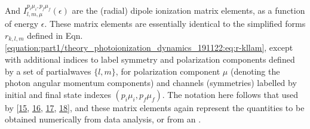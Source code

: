\documentclass[letterpaper,table,10pt,english]{jupyterBook}
\begin{document}
\sphinxAtStartPar
And \(I_{l,m,\mu}^{p_{i}\mu_{i},p_{f}\mu_{f}}(\epsilon)\) are the (radial)
dipole ionization matrix elements, as a function of energy \(\epsilon\).
These matrix elements are essentially identical to the simplified forms
\(r_{k,l,m}\) defined in Eqn. \eqref{equation:part1/theory_photoionization_dynamics_191122:eq:r-kllam}, except with additional indices to label
symmetry and polarization components defined by a set of partial\sphinxhyphen{}waves
\(\{l,m\}\), for polarization component \(\mu\) (denoting the photon angular
momentum components) and channels (symmetries) labelled by initial and
final state indexes \((p_{i}\mu_{i},p_{f}\mu_{f})\). The notation here
follows that used by  {[}\hyperlink{cite.backmatter/bibliography:id693}{15}, \hyperlink{cite.backmatter/bibliography:id567}{16}, \hyperlink{cite.backmatter/bibliography:id725}{17}, \hyperlink{cite.backmatter/bibliography:id696}{18}{]}, and these matrix elements again represent the quantities to be obtained numerically from data analysis, or from an .
\end{document}
